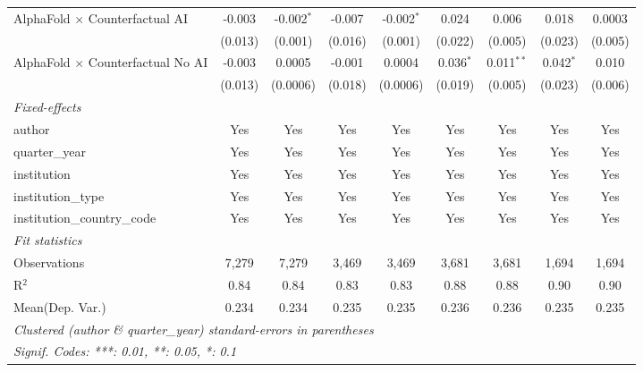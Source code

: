 \begin{tabular}{lcccccccc}
   AlphaFold $\times$ Counterfactual AI     & -0.003       & -0.002$^{*}$ & -0.007  & -0.002$^{*}$ & 0.024       & 0.006        & 0.018       & 0.0003\\   
                                            & (0.013)      & (0.001)      & (0.016) & (0.001)      & (0.022)     & (0.005)      & (0.023)     & (0.005)\\   
   AlphaFold $\times$ Counterfactual No AI  & -0.003       & 0.0005       & -0.001  & 0.0004       & 0.036$^{*}$ & 0.011$^{**}$ & 0.042$^{*}$ & 0.010\\   
                                            & (0.013)      & (0.0006)     & (0.018) & (0.0006)     & (0.019)     & (0.005)      & (0.023)     & (0.006)\\   
   \midrule
   \emph{Fixed-effects}\\
   author                                   & Yes          & Yes          & Yes     & Yes          & Yes         & Yes          & Yes         & Yes\\  
   quarter\_year                            & Yes          & Yes          & Yes     & Yes          & Yes         & Yes          & Yes         & Yes\\  
   institution                              & Yes          & Yes          & Yes     & Yes          & Yes         & Yes          & Yes         & Yes\\  
   institution\_type                        & Yes          & Yes          & Yes     & Yes          & Yes         & Yes          & Yes         & Yes\\  
   institution\_country\_code               & Yes          & Yes          & Yes     & Yes          & Yes         & Yes          & Yes         & Yes\\  
   \midrule
   \emph{Fit statistics}\\
   Observations                             & 7,279        & 7,279        & 3,469   & 3,469        & 3,681       & 3,681        & 1,694       & 1,694\\  
   R$^2$                                    & 0.84         & 0.84         & 0.83    & 0.83         & 0.88        & 0.88         & 0.90        & 0.90\\  
Mean(Dep. Var.) & 0.234 & 0.234 & 0.235 & 0.235 & 0.236 & 0.236 & 0.235 & 0.235 \\
   \midrule \midrule
   \multicolumn{9}{l}{\emph{Clustered (author \& quarter\_year) standard-errors in parentheses}}\\
   \multicolumn{9}{l}{\emph{Signif. Codes: ***: 0.01, **: 0.05, *: 0.1}}\\
\end{tabular}
\par\endgroup
